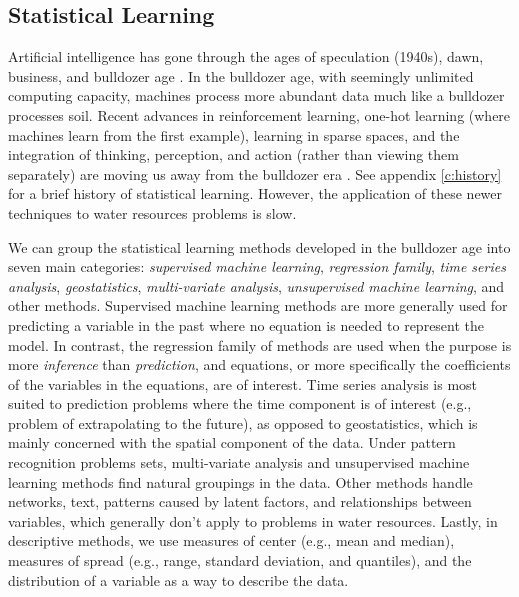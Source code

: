 \subsection{Statistical Learning}
Artificial intelligence has gone through the ages of speculation (1940s), dawn, business, and bulldozer age \cite{winston2010class}. In the bulldozer age, with seemingly unlimited computing capacity, machines process more abundant data much like a bulldozer processes soil. Recent advances in reinforcement learning, one-hot learning (where machines learn from the first example), learning in sparse spaces, and the integration of thinking, perception, and action (rather than viewing them separately) are moving us away from the bulldozer era \cite{winston2010class}. See appendix \ref{c:history} for a brief history of statistical learning. However, the application of these newer techniques to water resources problems is slow. 


We can group the statistical learning methods developed in the bulldozer age into seven main categories: \textit{supervised machine learning}, \textit{regression family}, \textit{time series analysis}, \textit{geostatistics}, \textit{multi-variate analysis}, \textit{unsupervised machine learning}, and other methods. Supervised machine learning methods are more generally used for predicting a variable in the past where no equation is needed to represent the model. In contrast, the regression family of methods are used when the purpose is more \textit{inference} than \textit{prediction}, and equations, or more specifically the coefficients of the variables in the equations, are of interest. Time series analysis is most suited to prediction problems where the time component is of interest (e.g., problem of extrapolating to the future), as opposed to geostatistics, which is mainly concerned with the spatial component of the data. Under pattern recognition problems sets, multi-variate analysis and unsupervised machine learning methods find natural groupings in the data. Other methods handle networks, text, patterns caused by latent factors, and relationships between variables, which generally don't apply to problems in water resources. Lastly, in descriptive methods, we use measures of center (e.g., mean and median), measures of spread (e.g., range, standard deviation, and quantiles), and the distribution of a variable as a way to describe the data. 

